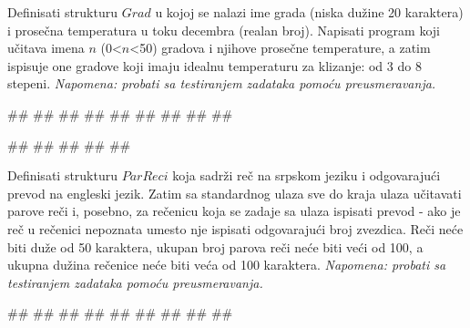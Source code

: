 \begin{Exercise}[label=p2.5_] 
  Definisati strukturu $Grad$ u kojoj se nalazi ime grada (niska dužine 20 karaktera) i prosečna temperatura u toku decembra (realan broj). Napisati program koji učitava imena $n$ (0<$n$<50) gradova i njihove prosečne temperature, a zatim ispisuje one gradove koji imaju idealnu temperaturu za klizanje: od 3 do 8 stepeni. \textit{Napomena: probati sa testiranjem zadataka pomoću preusmeravanja.}\\
\begin{maxitest}
\begin{upotreba}{1}
#\naslovInt#
##
##
##
##
##
##
##
##
\end{upotreba}
\end{maxitest}

\begin{maxitest}
\begin{upotreba}{2}
#\naslovInt#
##
##
##
##
\end{upotreba}
\end{maxitest}
 

\end{Exercise}
\begin{Answer}[ref=p2.5_]
\end{Answer}

\begin{Exercise}[label=p2.5_] 
 Definisati strukturu $ParReci$ koja sadrži reč na srpskom jeziku i odgovarajući prevod na engleski jezik. Zatim sa standardnog ulaza sve do kraja ulaza učitavati parove reči i, posebno, za rečenicu koja se zadaje sa ulaza ispisati prevod - ako je reč u rečenici nepoznata umesto nje ispisati odgovarajući broj zvezdica. Reči neće biti duže od 50 karaktera, ukupan broj parova reči neće biti veći od 100, a ukupna dužina rečenice neće biti veća od 100 karaktera. \textit{Napomena: probati sa testiranjem zadataka pomoću preusmeravanja.}\\
\begin{miditest}
\begin{upotreba}{1}
#\naslovInt#
##
##
##
##
##
##
##
##
\end{upotreba}
\end{miditest}
\end{Exercise}
\begin{Answer}[ref=p2.5_]
\end{Answer}

